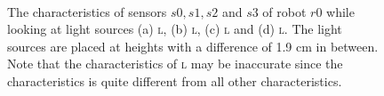 \begin{figure}
\centering
{}
\\
\caption{The characteristics of sensors $s0, s1, s2$ and $s3$ of robot $r0$ while looking at light sources (a) {\scshape l}, (b) {\scshape l}, (c) {\scshape l} and (d) {\scshape l}. The light sources are placed at heights with a difference of 1.9 cm in between. Note that the characteristics of {\scshape l} may be inaccurate since the characteristics is quite different from all other characteristics.}
\label{f:int:calibration}
\end{figure}

